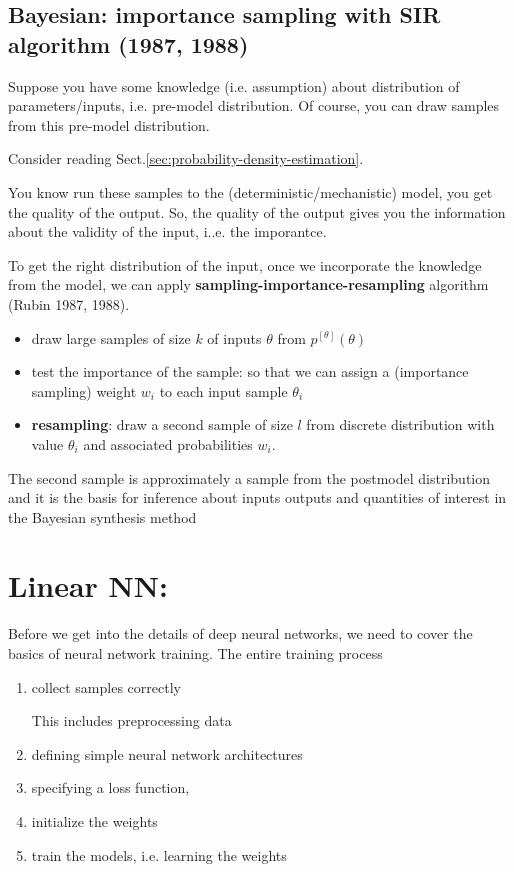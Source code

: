 \section{Bayesian: importance sampling with SIR algorithm (1987, 1988)}

Suppose you have some knowledge (i.e. assumption) about distribution of
parameters/inputs, i.e. pre-model distribution.
Of course, you can draw samples from this pre-model distribution. 

Consider reading Sect.\ref{sec:probability-density-estimation}.

You know run these samples to the (deterministic/mechanistic) model, you get the quality of the output. So, the quality of the output gives you
the information about the validity of the input, i..e. the imporantce.

To get the right distribution of the input, once we incorporate the knowledge from the model, we can apply 
{\bf sampling-importance-resampling} algorithm (Rubin 1987, 1988).

\begin{itemize}
  \item  draw large samples of size $k$ of inputs $\theta$ from $p^{[\theta]}(\theta)$
  
  \item  test the importance of the sample: so that we can assign a (importance
  sampling) weight $w_i$ to each input sample $\theta_i$
  
  \item {\bf resampling}: draw a second sample of size $l$ from discrete distribution with value $\theta_i$ and associated probabilities $w_i$.
\end{itemize}

The second sample is approximately a sample from the postmodel distribution and it is the
basis for inference about inputs outputs and quantities of interest in the Bayesian synthesis method


\chapter{Linear NN: }

Before we get into the details of deep neural networks, we need to cover the basics of neural network training.
The entire training process
\begin{enumerate}
  \item collect samples correctly
  
  This includes preprocessing data
  
  \item defining simple neural network architectures
  
  \item specifying a loss function,
  
  \item initialize the weights
  
  \item train the models, i.e. learning the weights
\end{enumerate}

